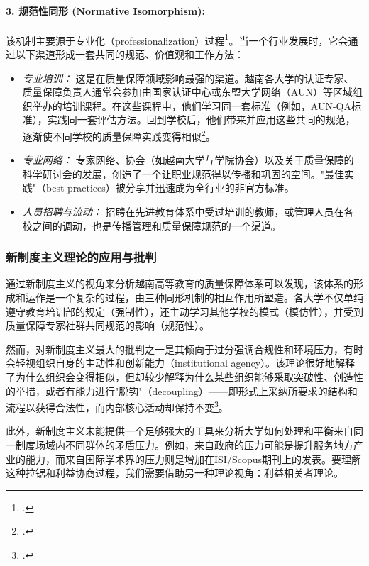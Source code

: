 \paragraph{3. 规范性同形 (Normative Isomorphism):}
该机制主要源于专业化（professionalization）过程\footcite{DiMaggioPowell1983}。当一个行业发展时，它会通过以下渠道形成一套共同的规范、价值观和工作方法：
\begin{itemize}
    \item \textit{专业培训：} 这是在质量保障领域影响最强的渠道。越南各大学的认证专家、质量保障负责人通常会参加由国家认证中心或东盟大学网络（AUN）等区域组织举办的培训课程。在这些课程中，他们学习同一套标准（例如，AUN-QA标准），实践同一套评估方法。回到学校后，他们带来并应用这些共同的规范，逐渐使不同学校的质量保障实践变得相似\footcite{AUN-QAGuide}。
    \item \textit{专业网络：} 专家网络、协会（如越南大学与学院协会）以及关于质量保障的科学研讨会的发展，创造了一个让职业规范得以传播和巩固的空间。"最佳实践"（best practices）被分享并迅速成为全行业的非官方标准。
    \item \textit{人员招聘与流动：} 招聘在先进教育体系中受过培训的教师，或管理人员在各校之间的调动，也是传播管理和质量保障规范的一个渠道。
\end{itemize}

\subsubsection{新制度主义理论的应用与批判}

通过新制度主义的视角来分析越南高等教育的质量保障体系可以发现，该体系的形成和运作是一个复杂的过程，由三种同形机制的相互作用所塑造。各大学不仅单纯遵守教育培训部的规定（强制性），还主动学习其他学校的模式（模仿性），并受到质量保障专家社群共同规范的影响（规范性）。

然而，对新制度主义最大的批判之一是其倾向于过分强调合规性和环境压力，有时会轻视组织自身的主动性和创新能力（institutional agency）。该理论很好地解释了为什么组织会变得相似，但却较少解释为什么某些组织能够采取突破性、创造性的举措，或者有能力进行"脱钩"（decoupling）——即形式上采纳所要求的结构和流程以获得合法性，而内部核心活动却保持不变\footcite{MeyerRowan1977}。

此外，新制度主义未能提供一个足够强大的工具来分析大学如何处理和平衡来自同一制度场域内不同群体的矛盾压力。例如，来自政府的压力可能是提升服务地方产业的能力，而来自国际学术界的压力则是增加在ISI/Scopus期刊上的发表。要理解这种拉锯和利益协商过程，我们需要借助另一种理论视角：利益相关者理论。

